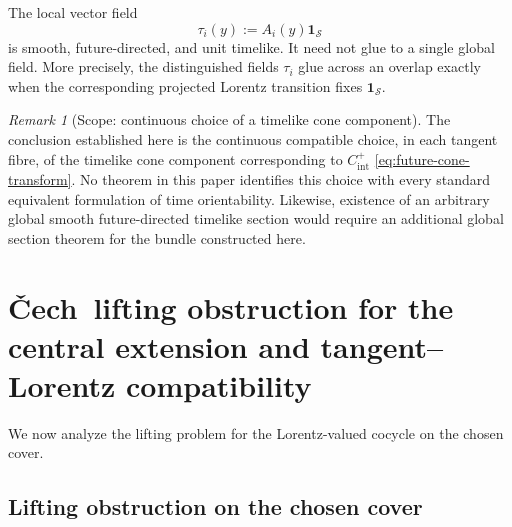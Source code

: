 \documentclass[11pt,a4paper]{article}
\theoremstyle{definition}
\theoremstyle{remark}
\newtheorem{remark}[theorem]{Remark}
\newcommand{\Smodel}{\mathcal{S}}
\newcommand{\Cech}{\ifmmode\text{\v{C}ech}\else\v{C}ech\fi}
\begin{document}
The local vector field
\[
   \tau_i(y):=A_i(y)\mathbf1_{\Smodel}
\tag{8.7}
\]
is smooth, future-directed, and unit timelike.  It need not glue to a
single global field.  More precisely, the distinguished fields
\(\tau_i\) glue across an overlap exactly when the corresponding projected
Lorentz transition fixes \(\mathbf1_{\Smodel}\).

\begin{remark}[Scope: continuous choice of a timelike cone component]
\label{bdry:timeorientation}
The conclusion established here is the continuous compatible choice, in each tangent fibre, of the timelike cone component corresponding to \(C^{+}_{\mathrm{int}}\)
\eqref{eq:future-cone-transform}.  No theorem in this paper identifies this
choice with every standard equivalent formulation of time orientability.
Likewise, existence of an arbitrary global smooth future-directed timelike
section would require an additional global section theorem for the bundle
constructed here.
\end{remark}

\clearpage
\section{\Cech\ lifting obstruction for the central extension and tangent--Lorentz compatibility}
\label{sec:lifting-compatibility}

We now analyze the lifting problem for the Lorentz-valued cocycle on the chosen cover.

\subsection{Lifting obstruction on the chosen cover}
\end{document}

